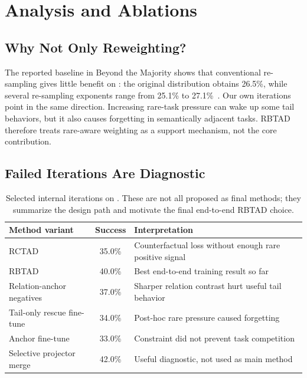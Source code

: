 \section{Analysis and Ablations}
\label{sec:analysis}

\subsection{Why Not Only Reweighting?}

The reported baseline in Beyond the Majority shows that conventional re-sampling gives little benefit on \liberocorelt{}: the original distribution obtains 26.5\%, while several re-sampling exponents range from 25.1\% to 27.1\%~\cite{zhu2026beyond}. Our own iterations point in the same direction. Increasing rare-task pressure can wake up some tail behaviors, but it also causes forgetting in semantically adjacent tasks. RBTAD therefore treats rare-aware weighting as a support mechanism, not the core contribution.

\subsection{Failed Iterations Are Diagnostic}

\begin{table}[t]
  \centering
  \caption{Selected internal iterations on \liberocorelt{}. These are not all proposed as final methods; they summarize the design path and motivate the final end-to-end RBTAD choice.}
  \label{tab:iterations}
  \begin{tabular}{lcl}
    \toprule
    Method variant & Success & Interpretation \\
    \midrule
    RCTAD & 35.0\% & Counterfactual loss without enough rare positive signal \\
    RBTAD & 40.0\% & Best end-to-end training result so far \\
    Relation-anchor negatives & 37.0\% & Sharper relation contrast hurt useful tail behavior \\
    Tail-only rescue fine-tune & 34.0\% & Post-hoc rare pressure caused forgetting \\
    Anchor fine-tune & 33.0\% & Constraint did not prevent task competition \\
    Selective projector merge & 42.0\% & Useful diagnostic, not used as main method \\
    \bottomrule
  \end{tabular}
\end{table}

